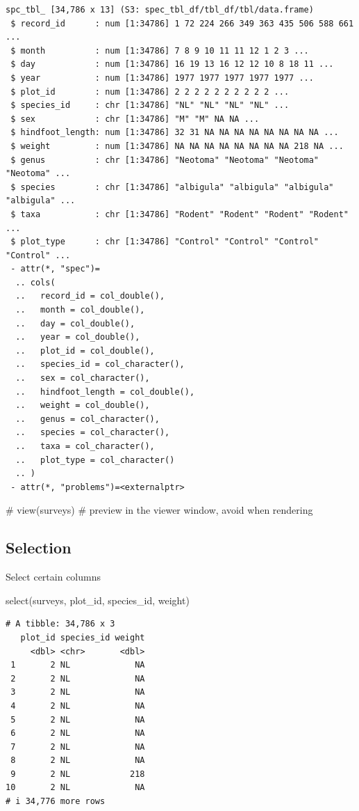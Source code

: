 \documentclass[
  letterpaper,
  DIV=11,
  numbers=noendperiod]{scrreprt}
\newenvironment{Shaded}{\begin{snugshade}}{\end{snugshade}}
\newcommand{\CommentTok}[1]{\textcolor[rgb]{0.37,0.37,0.37}{#1}}
\newcommand{\FunctionTok}[1]{\textcolor[rgb]{0.28,0.35,0.67}{#1}}
\newcommand{\NormalTok}[1]{\textcolor[rgb]{0.00,0.23,0.31}{#1}}
\begin{document}
\begin{verbatim}
spc_tbl_ [34,786 x 13] (S3: spec_tbl_df/tbl_df/tbl/data.frame)
 $ record_id      : num [1:34786] 1 72 224 266 349 363 435 506 588 661 ...
 $ month          : num [1:34786] 7 8 9 10 11 11 12 1 2 3 ...
 $ day            : num [1:34786] 16 19 13 16 12 12 10 8 18 11 ...
 $ year           : num [1:34786] 1977 1977 1977 1977 1977 ...
 $ plot_id        : num [1:34786] 2 2 2 2 2 2 2 2 2 2 ...
 $ species_id     : chr [1:34786] "NL" "NL" "NL" "NL" ...
 $ sex            : chr [1:34786] "M" "M" NA NA ...
 $ hindfoot_length: num [1:34786] 32 31 NA NA NA NA NA NA NA NA ...
 $ weight         : num [1:34786] NA NA NA NA NA NA NA NA 218 NA ...
 $ genus          : chr [1:34786] "Neotoma" "Neotoma" "Neotoma" "Neotoma" ...
 $ species        : chr [1:34786] "albigula" "albigula" "albigula" "albigula" ...
 $ taxa           : chr [1:34786] "Rodent" "Rodent" "Rodent" "Rodent" ...
 $ plot_type      : chr [1:34786] "Control" "Control" "Control" "Control" ...
 - attr(*, "spec")=
  .. cols(
  ..   record_id = col_double(),
  ..   month = col_double(),
  ..   day = col_double(),
  ..   year = col_double(),
  ..   plot_id = col_double(),
  ..   species_id = col_character(),
  ..   sex = col_character(),
  ..   hindfoot_length = col_double(),
  ..   weight = col_double(),
  ..   genus = col_character(),
  ..   species = col_character(),
  ..   taxa = col_character(),
  ..   plot_type = col_character()
  .. )
 - attr(*, "problems")=<externalptr> 
\end{verbatim}

\begin{Shaded}
\begin{Highlighting}[]
\CommentTok{\# view(surveys) \# preview in the viewer window, avoid when rendering}
\end{Highlighting}
\end{Shaded}

\subsection{Selection}\label{selection}

Select certain columns

\begin{Shaded}
\begin{Highlighting}[]
\FunctionTok{select}\NormalTok{(surveys, plot\_id, species\_id, weight)}
\end{Highlighting}
\end{Shaded}

\begin{verbatim}
# A tibble: 34,786 x 3
   plot_id species_id weight
     <dbl> <chr>       <dbl>
 1       2 NL             NA
 2       2 NL             NA
 3       2 NL             NA
 4       2 NL             NA
 5       2 NL             NA
 6       2 NL             NA
 7       2 NL             NA
 8       2 NL             NA
 9       2 NL            218
10       2 NL             NA
# i 34,776 more rows
\end{verbatim}
\end{document}
